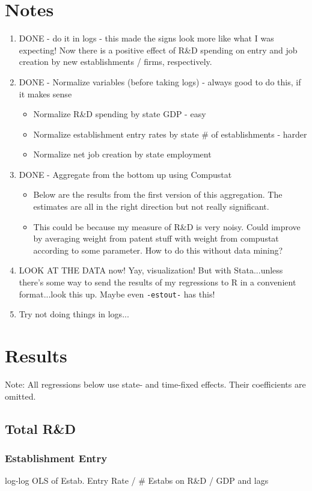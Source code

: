 \documentclass[7pt,english]{article}
\begin{document}
\section{Notes}
\begin{enumerate}
	\item DONE - do it in logs - this made the signs look more like what I was expecting! Now there is a positive effect of R\&D spending on entry and job creation by new establishments / firms, respectively. 
	\item DONE - Normalize variables (before taking logs) - always good to do this, if it makes sense 
	\begin{itemize}
		\item Normalize R\&D spending by state GDP - easy
		\item Normalize establishment entry rates by state \# of establishments - harder
		\item Normalize net job creation by state employment
	\end{itemize}
	\item DONE - Aggregate from the bottom up using Compustat 
	\begin{itemize}
		\item Below are the results from the first version of this aggregation. The estimates are all in the right direction but not really significant. 
		\item This could be because my measure of R\&D is very noisy. Could improve by averaging weight from patent stuff with weight from compustat according to some parameter. How to do this without data mining?
	\end{itemize}
	\item LOOK AT THE DATA now! Yay, visualization! But with Stata...unless there's some way to send the results of my regressions to R in a convenient format...look this up. Maybe even \texttt{-estout-} has this!  
	\item Try not doing things in logs...
\end{enumerate}


\section{Results}
Note: All regressions below use state- and time-fixed effects. Their coefficients are omitted. 
\subsection{Total R\&D}
\subsubsection{Establishment Entry}
\begin{table}[h!]
	\caption{log-log OLS of Estab. Entry Rate / \# Estabs on R\&D / GDP and lags}
	\center
	
\end{table}
\end{document}
